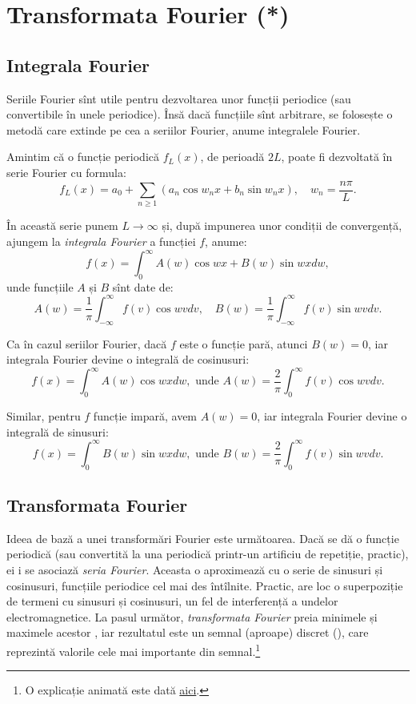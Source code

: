 \chapter{Transformata Fourier (*)}


\section{Integrala Fourier}
\indent\indent
Seriile Fourier sînt utile pentru dezvoltarea unor funcții periodice (sau convertibile
în unele periodice). Însă dacă funcțiile sînt arbitrare, se folosește o metodă care
extinde pe cea a seriilor Fourier, anume integralele Fourier.

Amintim că o funcție periodică $ f_L(x) $, de perioadă $ 2L $, poate fi dezvoltată în
serie Fourier cu formula:
\[
  f_L(x) = a_0 + \sum_{n \geq 1} (a_n \cos w_n x + b_n \sin w_n x), \quad %
  w_n = \frac{n\pi}{L}.
\]

În această serie punem $ L \to \infty $ și, după impunerea unor condiții
de convergență, ajungem la \emph{integrala Fourier} a funcției $ f $, anume:
\[
  f(x) = \int_0^\infty A(w) \cos wx + B(w) \sin wx dw,
\]
unde funcțiile $ A $ și $ B $ sînt date de:
\[
  A(w) = \frac{1}{\pi} \int_{-\infty}^\infty f(v) \cos wv dv, \quad %
  B(w) = \frac{1}{\pi} \int_{-\infty}^\infty f(v) \sin wv dv.
\]

Ca în cazul seriilor Fourier, dacă $ f $ este o funcție pară, atunci $ B(w) = 0 $,
iar integrala Fourier devine o integrală de cosinusuri:
\[
  f(x) = \int_0^\infty A(w) \cos wx dw, \text{ unde } %
  A(w) = \frac{2}{\pi} \int_0^\infty f(v) \cos wv dv.
\]

Similar, pentru $ f $ funcție impară, avem $ A(w) = 0 $, iar integrala Fourier devine
o integrală de sinusuri:
\[
  f(x) = \int_0^\infty B(w) \sin wx dw, \text{ unde } %
  B(w) = \frac{2}{\pi} \int_0^\infty f(v) \sin wv dv.
\]


\section{Transformata Fourier}
\indent\indent
Ideea de bază a unei transformări Fourier este următoarea. Dacă se dă o funcție periodică
(sau convertită la una periodică printr-un artificiu de repetiție, practic), ei i se
asociază \emph{seria Fourier}. Aceasta o aproximează cu o serie de sinusuri și cosinusuri,
funcțiile periodice cel mai des întîlnite. Practic, are loc o superpoziție de termeni cu
sinusuri și cosinusuri, un fel de interferență a undelor electromagnetice. La pasul
următor, \emph{transformata Fourier} preia minimele și maximele acestor ,
iar rezultatul este un semnal (aproape) discret (), care reprezintă
valorile cele mai importante din semnal.\footnote{O explicație animată este dată \href{https://en.wikipedia.org/wiki/Fourier_transform\#/media/File:Fourier_transform_time_and_frequency_domains_(small).gif}{aici}.}

